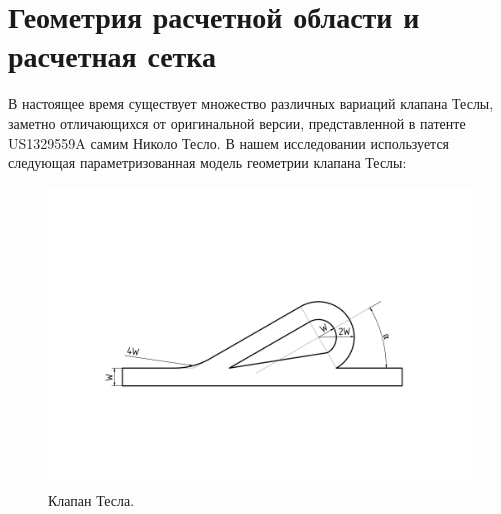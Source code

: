 \documentclass[14pt,a4paper]{article}
\begin{document}
        
    
    \section*{Геометрия расчетной области и расчетная сетка}

        В настоящее время существует множество различных вариаций клапана Теслы, заметно отличающихся от оригинальной версии, представленной в патенте US1329559A самим Николо Тесло. В нашем исследовании используется следующая параметризованная модель геометрии клапана Теслы:


        
         \begin{figure}[H]
             \centering
             \includegraphics[width = 1\linewidth]{teslaDesign}
             \caption{Клапан Тесла.}
             \label{fig:td}
         \end{figure}
        
\end{document}
